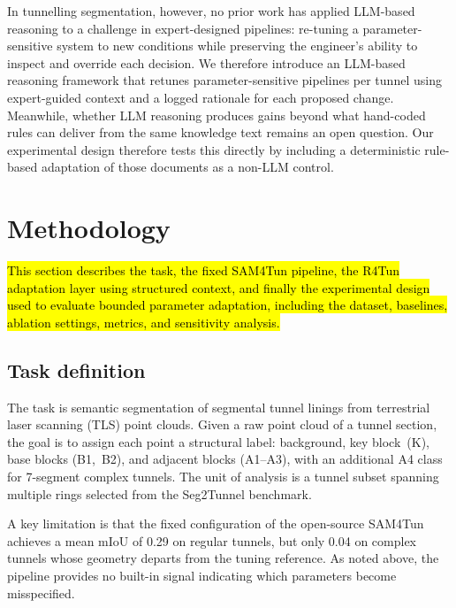 \documentclass[a4paper,fleqn]{cas-dc}
\begin{document}
{In tunnelling segmentation, however, no prior work has applied LLM-based reasoning to a challenge in expert-designed pipelines: re-tuning a parameter-sensitive system to new conditions while preserving the engineer's ability to inspect and override each decision. We therefore introduce an LLM-based reasoning framework that retunes parameter-sensitive pipelines per tunnel using expert-guided context and a logged rationale for each proposed change. Meanwhile, whether LLM reasoning produces gains beyond what hand-coded rules can deliver from the same knowledge text remains an open question. Our experimental design therefore tests this directly by including a deterministic rule-based adaptation of those documents as a non-LLM control.




\section{Methodology}\label{sec:methods}

\hl{This section describes the task, the fixed SAM4Tun pipeline, the R4Tun adaptation layer using structured context, and finally the experimental design used to evaluate bounded parameter adaptation, including the dataset, baselines, ablation settings, metrics, and sensitivity analysis.}

\subsection{Task definition}\label{sec:problem-def}

The task is semantic segmentation of segmental tunnel linings from terrestrial laser scanning (TLS) point clouds. Given a raw point cloud of a tunnel section, the goal is to assign each point a structural label: background, key block~(K), base blocks (B1,~B2), and adjacent blocks (A1--A3), with an additional A4 class for 7-segment complex tunnels. The unit of analysis is a tunnel subset spanning multiple rings selected from the Seg2Tunnel benchmark. 

A key limitation is that the fixed configuration of the open-source SAM4Tun achieves a mean mIoU of 0.29 on regular tunnels, but only 0.04 on complex tunnels whose geometry departs from the tuning reference. As noted above, the pipeline provides no built-in signal indicating which parameters become misspecified.

}
\end{document}

